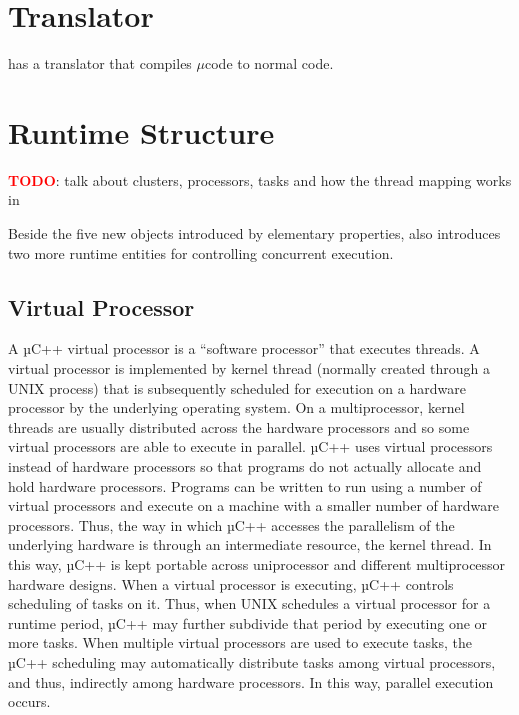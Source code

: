 \section{\uCPP Translator}
\uCPP has a translator that compiles $\mu$\CC code to normal \CC code.
\section{\uCPP Runtime Structure}
\textbf{\textcolor{red}{TODO}}: talk about clusters, processors, tasks and how
the thread mapping works in \uCPP

Beside the five new objects introduced by elementary properties, \uCPP also
introduces two more runtime entities for controlling concurrent execution.

\subsection{Virtual Processor}
A µC++ virtual processor is a “software processor” that executes threads. A
virtual processor is implemented by kernel
thread (normally created through a UNIX process) that is subsequently scheduled
for execution on a hardware
    processor by the underlying operating system. On a multiprocessor, kernel
    threads are usually distributed across the hardware processors and so some
    virtual processors are able to execute in parallel. µC++ uses virtual
    processors instead
    of hardware processors so that programs do not actually allocate and hold
    hardware processors. Programs can
    be written to run using a number of virtual processors and execute on a
    machine with a smaller number of hardware
    processors. Thus, the way in which µC++ accesses the parallelism of the
    underlying hardware is through an intermediate
    resource, the kernel thread. In this way, µC++ is kept portable across
    uniprocessor and different multiprocessor
    hardware designs.
    When a virtual processor is executing, µC++ controls scheduling of tasks on
    it. Thus, when UNIX schedules a
    virtual processor for a runtime period, µC++ may further subdivide that
    period by executing one or more tasks. When
    multiple virtual processors are used to execute tasks, the µC++ scheduling
    may automatically distribute tasks among
    virtual processors, and thus, indirectly among hardware processors. In this
    way, parallel execution occurs.
